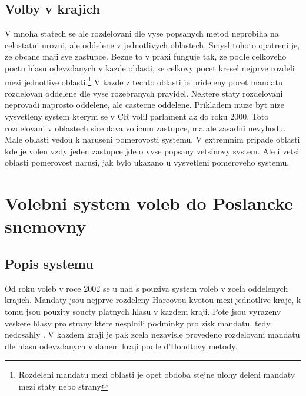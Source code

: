 \documentclass[12pt,a4paper]{scrreprt}
\begin{document}
\section{Volby v krajich}
V mnoha statech se ale rozdelovani dle vyse popsanych metod neprobiha na celostatni urovni, ale oddelene v jednotlivych oblastech.
Smysl tohoto opatreni je, ze obcane maji sve  zastupce.
Bezne to v praxi funguje tak, ze podle celkoveho poctu hlasu odevzdanych v kazde oblasti, se celkovy pocet kresel nejprve rozdeli mezi jednotlive oblasti.\footnote{Rozdeleni mandatu mezi oblasti je opet obdoba stejne ulohy deleni mandaty mezi staty nebo strany}
V kazde z techto oblasti je prideleny pocet mandatu rozdelovan oddelene dle vyse rozebranych pravidel.
Nektere staty rozdelovani neprovadi naprosto oddelene, ale castecne oddelene.
Prikladem muze byt nize vysvetleny system kterym se v CR volil parlament az do roku 2000.
Toto rozdelovani v oblastech sice dava volicum  zastupce, ma ale zasadni nevyhodu.
Male oblasti vedou k naruseni pomerovosti systemu.
V extremnim pripade oblasti kde je volen vzdy jeden zastupce jde o vyse popsany vetsinovy system. 
Ale i vetsi oblasti pomerovost narusi, jak bylo ukazano u vysvetleni pomeroveho systemu.

\chapter{Volebni system voleb do Poslancke snemovny}
\section{Popis systemu}
Od roku voleb v roce 2002 se u nad s pouziva system voleb v zcela oddelenych krajich.
Mandaty jsou nejprve rozdeleny Hareovou kvotou mezi jednotlive kraje, k tomu jsou pouzity soucty platnych hlasu v kazdem kraji.
Pote jsou vyrazeny veskere hlasy pro strany ktere nesplnili podminky pro zisk mandatu, tedy nedosahly .
V kazdem kraji je pak zcela nezavisle provedeno rozdelovani mandatu dle hlasu odevzdanych v danem kraji podle d'Hondtovy metody.
\end{document}
